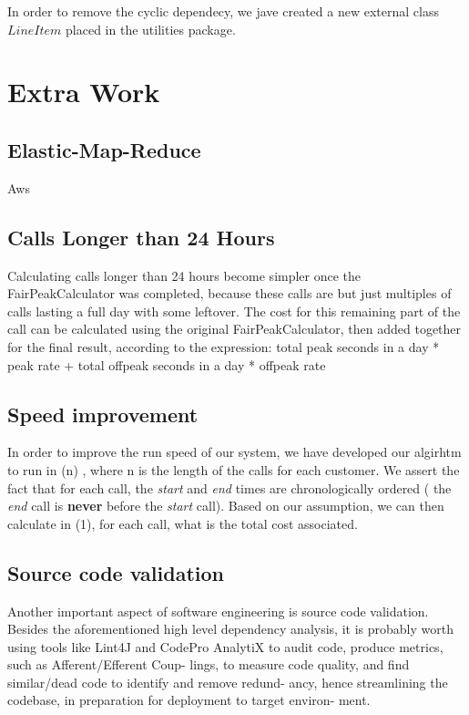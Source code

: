 \documentclass[11pt,twocolumn]{article} %
\begin{document}
In order to remove the cyclic dependecy, we jave created a new external class $LineItem$ placed in the 
utilities package.


\section{Extra Work}
\subsection{Elastic-Map-Reduce}
Aws


\subsection{Calls Longer than 24 Hours}
Calculating calls longer than 24 hours become simpler once the FairPeakCalculator was
completed, because these calls are but just multiples of calls lasting a full day with some
leftover. The cost for this remaining part of the call can be calculated using the original
FairPeakCalculator, then added together for the final result, according to the expression:
total peak seconds in a day * peak rate + total offpeak seconds in a day * offpeak rate

\subsection{Speed improvement}

In order to improve the run speed of our system, we have developed our algirhtm to run in \Theta(n)
, where n is the length of the calls for each customer. We assert the fact that for each call,
the \textit{start} and \textit{end} times are chronologically ordered ( the \textit{end} call is \textbf{never}
before the \textit{start} call). Based on our assumption, we can then calculate in \Theta(1), for each call,
what is the total cost associated. 

\subsection{Source code validation}
Another important aspect of software engineering is source code validation. Besides the
aforementioned high level dependency analysis, it is probably worth using tools like Lint4J
and CodePro AnalytiX to audit code, produce metrics, such as Afferent/Efferent Coup-
lings, to measure code quality, and find similar/dead code to identify and remove redund-
ancy, hence streamlining the codebase, in preparation for deployment to target environ-
ment.
\end{document}
